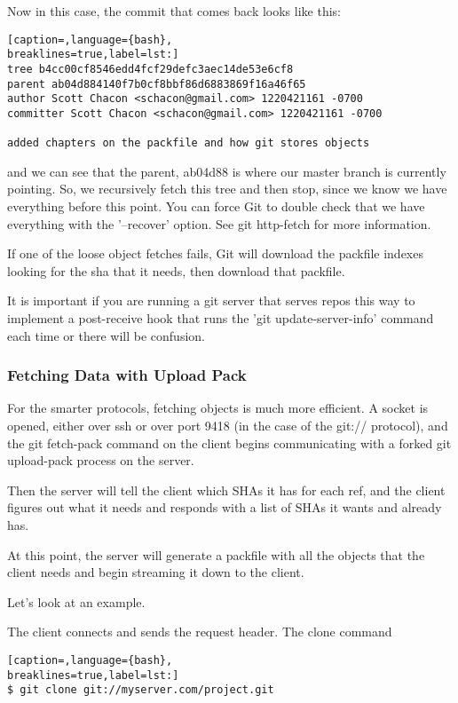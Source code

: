 Now in this case, the commit that comes back looks like this:
\lstset{basicstyle=\scriptsize, numbers=none, captionpos=b, tabsize=4}
\begin{lstlisting}[caption=,language={bash},
breaklines=true,label=lst:]
tree b4cc00cf8546edd4fcf29defc3aec14de53e6cf8
parent ab04d884140f7b0cf8bbf86d6883869f16a46f65
author Scott Chacon <schacon@gmail.com> 1220421161 -0700
committer Scott Chacon <schacon@gmail.com> 1220421161 -0700

added chapters on the packfile and how git stores objects
\end{lstlisting}

and we can see that the parent, ab04d88 is where our master branch is currently
pointing. So, we recursively fetch this tree and then stop, since we know we
have everything before this point. You can force Git to double check that we
have everything with the '--recover' option. See git http-fetch for more
information.

If one of the loose object fetches fails, Git will download the packfile
indexes looking for the sha that it needs, then download that packfile.

It is important if you are running a git server that serves repos this way to
implement a post-receive hook that runs the 'git update-server-info' command
each time or there will be confusion. 

\subsubsection{Fetching Data with Upload Pack}
For the smarter protocols, fetching objects is much more efficient. A socket is
opened, either over ssh or over port 9418 (in the case of the git:// protocol),
and the git fetch-pack command on the client begins communicating with a forked
git upload-pack process on the server.

Then the server will tell the client which SHAs it has for each ref, and the
client figures out what it needs and responds with a list of SHAs it wants and
already has.

At this point, the server will generate a packfile with all the objects that
the client needs and begin streaming it down to the client.

Let's look at an example.

The client connects and sends the request header. The clone command
\lstset{basicstyle=\scriptsize, numbers=none, captionpos=b, tabsize=4}
\begin{lstlisting}[caption=,language={bash},
breaklines=true,label=lst:]
$ git clone git://myserver.com/project.git
\end{lstlisting}

